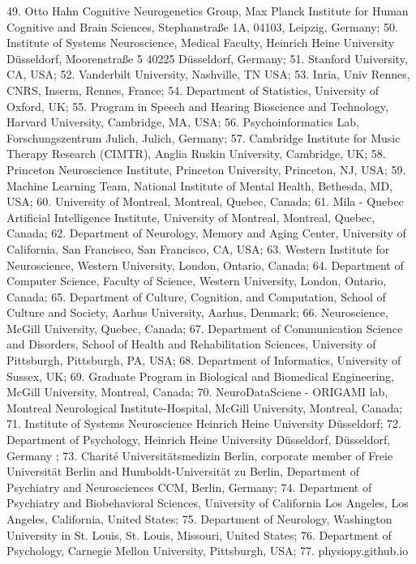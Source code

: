 \documentclass[10pt,a4paper,twocolumns]{proc}
\begin{document}
{49. Otto Hahn Cognitive Neurogenetics Group, Max Planck Institute for Human Cognitive and Brain Sciences, Stephanstraße 1A, 04103, Leipzig, Germany; %
50. Institute of Systems Neuroscience, Medical Faculty, Heinrich Heine University Düsseldorf, Moorenstraße 5 40225 Düsseldorf, Germany; %
51. Stanford University, CA, USA; %
52. Vanderbilt University, Nashville, TN USA; %
53. Inria, Univ Rennes, CNRS, Inserm, Rennes, France; %
54. Department of Statistics, University of Oxford, UK; %
55. Program in Speech and Hearing Bioscience and Technology, Harvard University, Cambridge, MA, USA; %
56. Psychoinformatics Lab, Forschungszentrum Julich, Julich, Germany; %
57. Cambridge Institute for Music Therapy Research (CIMTR), Anglia Ruskin University, Cambridge, UK; %
58. Princeton Neuroscience Institute, Princeton University, Princeton, NJ, USA; %
59. Machine Learning Team, National Institute of Mental Health, Bethesda, MD, USA; %
60. University of Montreal, Montreal, Quebec, Canada; %
61. Mila - Quebec Artificial Intelligence Institute, University of Montreal, Montreal, Quebec, Canada; %
62. Department of Neurology, Memory and Aging Center, University of California, San Francisco, San Francisco, CA, USA; %
63. Western Institute for Neuroscience, Western University, London, Ontario, Canada; %
64. Department of Computer Science, Faculty of Science, Western University, London, Ontario, Canada; %
65. Department of Culture, Cognition, and Computation, School of Culture and Society, Aarhus University, Aarhus, Denmark; %
66. Neuroscience, McGill University, Quebec, Canada; %
67. Department of Communication Science and Disorders, School of Health and Rehabilitation Sciences, University of Pittsburgh, Pittsburgh, PA, USA; %
68. Department of Informatics, University of Sussex, UK; %
69. Graduate Program in Biological and Biomedical Engineering, McGill University, Montreal, Canada; %
70. NeuroDataSciene - ORIGAMI lab, Montreal Neurological Institute-Hospital, McGill University, Montreal, Canada; %
71. Institute of Systems Neuroscience Heinrich Heine University Düsseldorf; %
72. Department of Psychology, Heinrich Heine University Düsseldorf, Düsseldorf, Germany ; %
73. Charité Universitätsmedizin Berlin, corporate member of Freie Universität Berlin and Humboldt-Universität zu Berlin, Department of Psychiatry and Neurosciences CCM, Berlin, Germany; %
74. Department of Psychiatry and Biobehavioral Sciences, University of California Los Angeles, Los Angeles, California, United States; %
75. Department of Neurology, Washington University in St. Louis, St. Louis, Missouri, United States; %
76. Department of Psychology, Carnegie Mellon University, Pittsburgh, USA; %
77. physiopy.github.io %
}
\\
\end{document}
